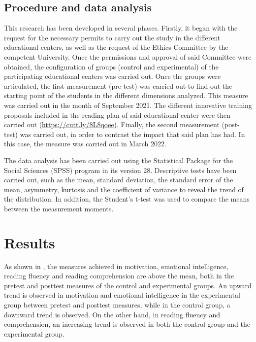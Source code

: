 \documentclass[english]{textolivre}
\begin{document}
\subsection{Procedure and data analysis}
This research has been developed in several phases. Firstly, it began with the request for the necessary permits to carry out the study in the different educational centers, as well as the request of the Ethics Committee by the competent University. Once the permissions and approval of said Committee were obtained, the configuration of groups (control and experimental) of the participating educational centers was carried out. Once the groups were articulated, the first measurement (pre-test) was carried out to find out the starting point of the students in the different dimensions analyzed. This measure was carried out in the month of September 2021. The different innovative training proposals included in the reading plan of said educational center were then carried out (\url{https://cutt.ly/8L8qoee}). Finally, the second measurement (post-test) was carried out, in order to contrast the impact that said plan has had. In this case, the measure was carried out in March 2022.

The data analysis has been carried out using the Statistical Package for the Social Sciences (SPSS) program in its version 28. Descriptive tests have been carried out, such as the mean, standard deviation, the standard error of the mean, asymmetry, kurtosis and the coefficient of variance to reveal the trend of the distribution. In addition, the Student's t-test was used to compare the means between the measurement moments.

\section{Results}
As shown in , the measures achieved in motivation, emotional intelligence, reading fluency and reading comprehension are above the mean, both in the pretest and posttest measures of the control and experimental groups. An upward trend is observed in motivation and emotional intelligence in the experimental group between pretest and posttest measures, while in the control group, a downward trend is observed. On the other hand, in reading fluency and comprehension, an increasing trend is observed in both the control group and the experimental group. 
\end{document}
